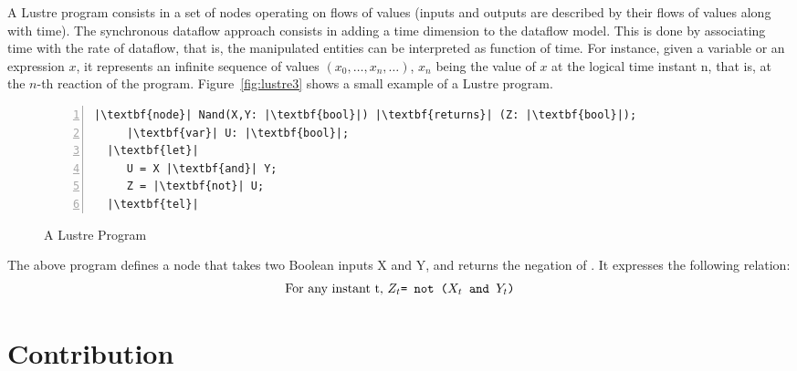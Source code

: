 A Lustre program consists in a set of nodes operating on flows of values (inputs and outputs 
are described by their flows of values along with time). 
The synchronous dataflow approach consists in adding a time dimension to the dataflow model.
This is done by associating time with the rate of dataflow, that is, the manipulated entities
can be interpreted as function of time.
For instance, given a variable or an expression $x$,
it represents an infinite sequence of values $(x_0,\ldots,x_n,\ldots)$, $x_n$ being the value
of $x$ at the logical time instant n, that is, at the $n$-th  reaction of the program. 
Figure~\ref{fig:lustre3} shows a small example of a Lustre program.
\begin{figure}[H]
\begin{lstlisting}[basicstyle=\ttfamily,
escapeinside={||},
mathescape=true,
numbers=left,
backgroundcolor=\color{gray!20}]
  |\textbf{node}| Nand(X,Y: |\textbf{bool}|) |\textbf{returns}| (Z: |\textbf{bool}|);
     |\textbf{var}| U: |\textbf{bool}|;
  |\textbf{let}|
     U = X |\textbf{and}| Y;
     Z = |\textbf{not}| U;
  |\textbf{tel}|
\end{lstlisting}
\caption{A Lustre Program}
\label{lst:lustre3}
\end{figure}
The above program defines a node that takes two Boolean inputs X and Y, and returns the negation
of . It expresses the following relation:
\begin{displaymath}
  \text{For any instant t, \texttt{$Z_t$= not ($X_t$ and $Y_t$)}} 
\end{displaymath}

\section{Contribution}

